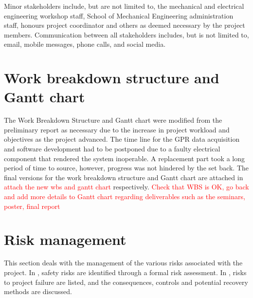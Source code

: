 \documentclass[main.tex]{subfiles}
\begin{document}
Minor stakeholders include, but are not limited to, the mechanical and electrical engineering workshop staff, School of Mechanical Engineering administration staff, honours project coordinator and others as deemed necessary by the project members. Communication between all stakeholders includes, but is not limited to, email, mobile messages, phone calls, and social media. %

\section{Work breakdown structure and Gantt chart}
The Work Breakdown Structure and Gantt chart were modified from the preliminary report as necessary due to the increase in project workload and objectives as the project advanced. The time line for the GPR data acquisition and software development had to be postponed due to a faulty electrical component that rendered the system inoperable. A replacement part took a long period of time to source, however, progress was not hindered by the set back. The final versions for the work breakdown structure and Gantt chart are attached in \textcolor{red}{attach the new wbs and gantt chart} 
  respectively.  
\textcolor{red}{Check that WBS is OK, go back and add more details to Gantt chart regarding deliverables such as the seminars, poster, final report}

\section{Risk management}
This section deals with the management of the various risks associated with the project. In , safety risks are identified through a formal risk assessment. In , risks to project failure are listed, and the consequences, controls and potential recovery methods are discussed. 
\end{document}
